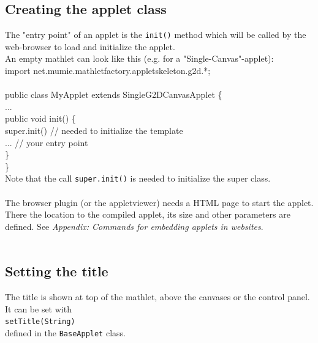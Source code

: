 \documentclass[a4paper,12pt]{book}
\begin{document}
  \subsection{Creating the applet class}
  The "entry point" of an applet is the \verb|init()| method which will be called
  by the web-browser to load and initialize the applet.\\
  An empty mathlet can look like this (e.g. for a "Single-Canvas"-applet):\\
  {\small\ttfamily
  \indent import net.mumie.mathletfactory.appletskeleton.g2d.*;\\\\
  \indent public class MyApplet extends SingleG2DCanvasApplet \{\\
  \indent ...\\
  \indent \indent public void init() \{\\
  \indent \indent \indent super.init() // needed to initialize the template\\
  \indent \indent\indent ... // your entry point\\
  \indent \indent \}\\
  \indent \}\\
  }
  Note that the call \verb|super.init()| is needed to initialize the super class.\\\\
  The browser plugin (or the appletviewer) needs a HTML page to start the applet.
  There the location to the compiled applet, its size and other parameters are defined.
  See \small{\textit{Appendix: Commands for embedding applets in websites}}.\\\\
  
  \subsection{Setting the title}
  The title is shown at top of the mathlet, above the canvases or the control panel.
  It can be set with\\
  \indent \verb|setTitle(String)|\\
  defined in the \verb|BaseApplet| class.
  
\end{document}
